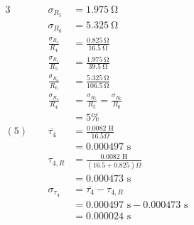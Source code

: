 \documentclass[12pt]{article}
\begin{document}
\begin{alignat*}{3}
            &&\sigma_{R_5} & = 1.975\mathrm{\ \Omega}\\
            &&\sigma_{R_6} & = 5.325\mathrm{\ \Omega}\\
            &&\frac{\sigma_{R_4}}{R_4} & = \frac{0.825 \mathrm{\ \Omega}}{16.5 \mathrm{\ \Omega}}\\
            &&\frac{\sigma_{R_5}}{R_5} & = \frac{1.975 \mathrm{\ \Omega}}{39.5 \mathrm{\ \Omega}}\\
            &&\frac{\sigma_{R_6}}{R_6} & = \frac{5.325 \mathrm{\ \Omega}}{106.5 \mathrm{\ \Omega}}\\
            &&\frac{\sigma_{R_4}}{R_4} & = \frac{\sigma_{R_5}}{R_5} = \frac{\sigma_{R_6}}{R_6}\\
            &&&=5\%\\
            (5)\ \ 
            &&\overline{\tau_4} &= \frac{0.0082 \text{ H}}{16.5 \Omega}\\
            &&&= 0.000497 \text{ s}\\
            &&\tau_{4,R} &= \frac{0.0082 \text{ H}}{(16.5 + 0.825) \Omega}\\
            &&&= 0.000473 \text{ s}\\
            &&\sigma_{\tau_4} &= \overline{\tau_4} - \tau_{4,R}\\
            &&& = 0.000497 \text{ s} - 0.000473 \text{ s}\\
            &&& = 0.000024 \text{ s}
        \end{alignat*}
\end{document}
